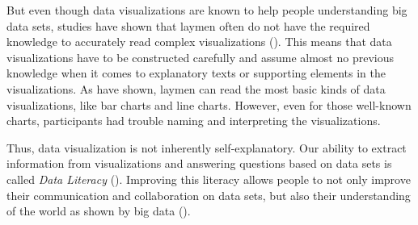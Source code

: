 But even though data visualizations are known to help people understanding big data sets, studies have shown that laymen often do not have the required knowledge to accurately read complex visualizations (\cite{bornerInvestigatingAspectsData2016}). This means that data visualizations have to be constructed carefully and assume almost no previous knowledge when it comes to explanatory texts or supporting elements in the visualizations. As \citeauthor{bornerInvestigatingAspectsData2016} have shown, laymen can read the most basic kinds of data visualizations, like bar charts and line charts. However, even for those well-known charts, participants had trouble naming and interpreting the visualizations.

Thus, data visualization is not inherently self-explanatory. Our ability to extract information from visualizations and answering questions based on data sets is called \emph{Data Literacy} (\cite{boyPrincipledWayAssessing2014}). Improving this literacy allows people to not only improve their communication and collaboration on data sets, but also their understanding of the world as shown by big data (\cite{bornerDataVisualizationLiteracy2019}). 

